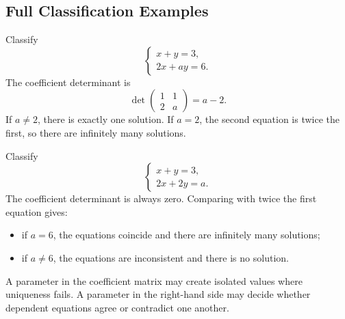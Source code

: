 \subsection{Full Classification Examples}

\begin{examplebox}
Classify
\[
\begin{cases}
x+y=3,\\
2x+ay=6.
\end{cases}
\]
The coefficient determinant is
\[
\det\begin{pmatrix}1&1\\2&a\end{pmatrix}=a-2.
\]
If $a\neq2$, there is exactly one solution. If $a=2$, the second equation is twice the first, so there are infinitely many solutions.
\end{examplebox}

\begin{examplebox}
Classify
\[
\begin{cases}
x+y=3,\\
2x+2y=a.
\end{cases}
\]
The coefficient determinant is always zero. Comparing with twice the first equation gives:
\begin{itemize}
\item if $a=6$, the equations coincide and there are infinitely many solutions;
\item if $a\neq6$, the equations are inconsistent and there is no solution.
\end{itemize}
\end{examplebox}

\begin{interpretationbox}
A parameter in the coefficient matrix may create isolated values where uniqueness fails. A parameter in the right-hand side may decide whether dependent equations agree or contradict one another.
\end{interpretationbox}
